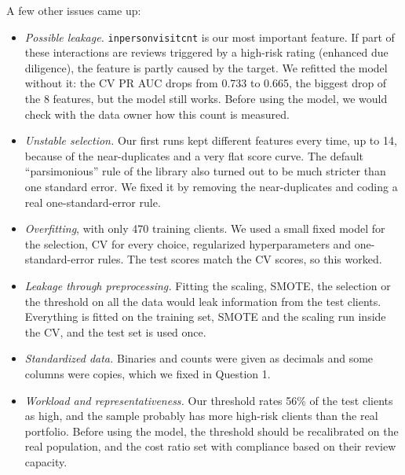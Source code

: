 \documentclass[12pt]{article}
\renewcommand{\_}{\textunderscore\allowbreak}
\begin{document}
A few other issues came up:
\begin{itemize}[nosep]
    \item \textit{Possible leakage.} \texttt{in\_person\_visit\_cnt} is our most important feature. If part of these interactions are reviews triggered by a high-risk rating (enhanced due diligence), the feature is partly caused by the target. We refitted the model without it: the CV PR AUC drops from 0.733 to 0.665, the biggest drop of the 8 features, but the model still works. Before using the model, we would check with the data owner how this count is measured.
    \item \textit{Unstable selection.} Our first runs kept different features every time, up to 14, because of the near-duplicates and a very flat score curve. The default ``parsimonious'' rule of the library also turned out to be much stricter than one standard error. We fixed it by removing the near-duplicates and coding a real one-standard-error rule.
    \item \textit{Overfitting}, with only 470 training clients. We used a small fixed model for the selection, CV for every choice, regularized hyperparameters and one-standard-error rules. The test scores match the CV scores, so this worked.
    \item \textit{Leakage through preprocessing.} Fitting the scaling, SMOTE, the selection or the threshold on all the data would leak information from the test clients. Everything is fitted on the training set, SMOTE and the scaling run inside the CV, and the test set is used once.
    \item \textit{Standardized data.} Binaries and counts were given as decimals and some columns were copies, which we fixed in Question 1.
    \item \textit{Workload and representativeness.} Our threshold rates 56\% of the test clients as high, and the sample probably has more high-risk clients than the real portfolio. Before using the model, the threshold should be recalibrated on the real population, and the cost ratio set with compliance based on their review capacity.
\end{itemize}
\end{document}
